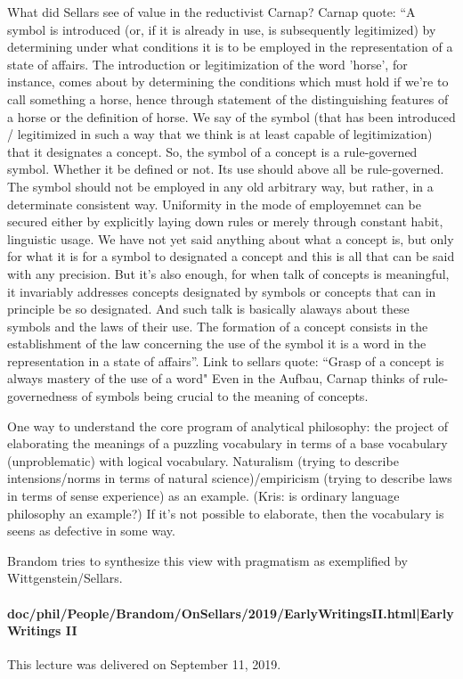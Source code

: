 \documentclass[12pt,a4paper]{report}
\begin{document}
What did Sellars see of value in the reductivist Carnap? Carnap quote: ``A symbol is introduced (or, if it is already in use, is subsequently legitimized) by determining under what conditions it is to be employed in the representation of a state of affairs. The introduction or legitimization of the word 'horse', for instance, comes about by determining the conditions which must hold if we're to call something a horse, hence through statement of the distinguishing features of a horse or the definition of horse. We say of the symbol (that has been introduced / legitimized in such a way that we think is at least capable of legitimization) that it designates a concept. So, the symbol of a concept is a rule-governed symbol. Whether it be defined or not. Its use should above all be rule-governed. The symbol should not be employed in any old arbitrary way, but rather, in a determinate consistent way. Uniformity in the mode of employemnet can be secured either by explicitly laying down rules or merely through constant habit, linguistic usage. We have not yet said anything about what a concept is, but only for what it is for a symbol to designated a concept and this is all that can be said with any precision. But it's also enough, for when talk of concepts is meaningful, it invariably addresses concepts designated by symbols or concepts that can in principle be so designated. And such talk is basically alaways about these symbols and the laws of their use. The formation of a concept consists in the establishment of the law concerning the use of the symbol it is a word in the representation in a state of affairs''. Link to sellars quote: ``Grasp of a concept is always mastery of the use of a word" Even in the Aufbau, Carnap thinks of rule-governedness of symbols being crucial to the meaning of concepts.

One way to understand the core program of analytical philosophy: the project of elaborating the meanings of a puzzling vocabulary in terms of a base vocabulary (unproblematic) with logical vocabulary. Naturalism (trying to describe intensions/norms in terms of natural science)/empiricism (trying to describe laws in terms of sense experience) as an example. (Kris: is ordinary language philosophy an example?) If it's not possible to elaborate, then the vocabulary is seens as defective in some way.

Brandom tries to synthesize this view with pragmatism as exemplified by Wittgenstein/Sellars.
\paragraph{doc/phil/People/Brandom/OnSellars/2019/EarlyWritingsII.html|Early Writings II}
This lecture was delivered on September 11, 2019.
\end{document}
